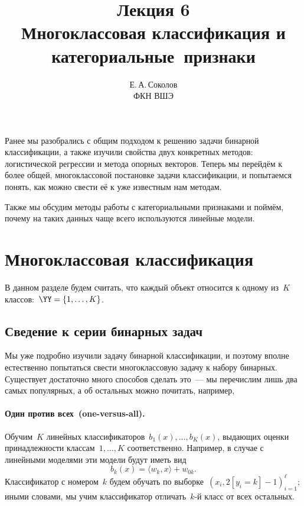 \documentclass[12pt,fleqn]{article}
\begin{document}
\title{Лекция 6\\Многоклассовая классификация и категориальные~признаки}
\author{Е.\,А.\,Соколов\\ФКН ВШЭ}
\maketitle

Ранее мы разобрались с общим подходом к решению задачи бинарной классификации,
а также изучили свойства двух конкретных методов: логистической регрессии и метода опорных векторов.
Теперь мы перейдём к более общей, многоклассовой постановке задачи классификации,
и попытаемся понять, как можно свести её к уже известным нам методам.

Также мы обсудим методы работы с категориальными признаками
и поймём, почему на таких данных чаще всего используются линейные модели.

\section{Многоклассовая классификация}

В данном разделе будем считать, что каждый объект относится к одному из~$K$ классов:~$\YY = \{1, \dots, K\}$.

\subsection{Сведение к серии бинарных задач}

Мы уже подробно изучили задачу бинарной классификации, и поэтому вполне естественно
попытаться свести многоклассовую задачу к набору бинарных.
Существует достаточно много способов сделать это~--- мы перечислим лишь
два самых популярных, а об остальных можно почитать, например, \cite[раздел 4.2.7]{merkov14ml}

\paragraph{Один против всех~(one-versus-all).}
Обучим~$K$ линейных классификаторов~$b_1(x), \dots, b_K(x)$,
выдающих оценки принадлежности классам~$1, \dots, K$ соответственно.
Например, в случае с линейными моделями эти модели будут иметь вид
\[
    b_k(x) = \langle w_k, x \rangle + w_{0k}.
\]
Классификатор с номером~$k$ будем обучать по
выборке~$\left(x_i, 2 [y_i = k] - 1\right)_{i = 1}^{\ell}$;
иными словами, мы учим классификатор отличать~$k$-й класс от всех остальных.
\end{document}
